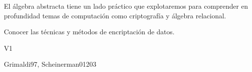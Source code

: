 \begin{syllabus}


\begin{justification}
El álgebra abstracta tiene un lado práctico que explotaremos para
comprender en profundidad temas de computación como criptografía y
álgebra relacional.
\end{justification}

\begin{goals}
\item Conocer las técnicas y métodos de encriptación de datos.
\end{goals}

\begin{outcomes}{V1}
   \item {}
   \item {}
   \item {}
\end{outcomes}

\begin{unit}{\IASCryptography}{}{Grimaldi97, Scheinerman01}{20}{3}
    \IASCryptographyAllTopics
    \IASCryptographyAllLearningOutcomes
    
\end{unit}




\end{syllabus}

